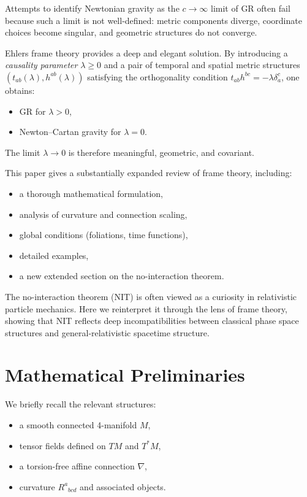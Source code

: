 \documentclass[12pt]{article}
\begin{document}
Attempts to identify Newtonian gravity as the $c \to \infty$ limit of GR often 
fail because such a limit is not well-defined: metric components diverge,
coordinate choices become singular, and geometric structures do not converge.

Ehlers frame theory provides a deep and elegant solution.
By introducing a {\it causality parameter} $\lambda \ge 0$ and a pair
of temporal and spatial metric structures $(t_{ab}(\lambda),h^{ab}(\lambda))$
satisfying the orthogonality condition 
$t_{ab} h^{bc}=-\lambda\delta^c_a$, 
one obtains:
\begin{itemize}
\item GR for $\lambda>0$,
\item Newton--Cartan gravity for $\lambda=0$.
\end{itemize}
The limit $\lambda\to0$ is therefore meaningful, geometric, and covariant.

This paper gives a substantially expanded review of frame theory, including:
\begin{itemize}
\item a thorough mathematical formulation,
\item analysis of curvature and connection scaling,
\item global conditions (foliations, time functions),
\item detailed examples,
\item a new extended section on the no-interaction theorem.
\end{itemize}

The no-interaction theorem (NIT) is often viewed as a curiosity in 
relativistic particle mechanics.
Here we reinterpret it through the lens of frame theory, showing that
NIT reflects deep incompatibilities between classical phase space 
structures and general-relativistic spacetime structure.

\section{Mathematical Preliminaries}

We briefly recall the relevant structures:
\begin{itemize}
\item a smooth connected 4-manifold $M$,
\item tensor fields defined on $TM$ and $T^*M$,
\item a torsion-free affine connection $\nabla$,
\item curvature $R^a{}_{bcd}$ and associated objects.
\end{itemize}
\end{document}
